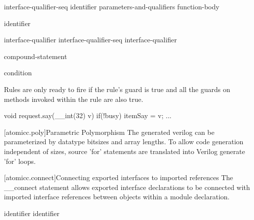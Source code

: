 \begin{bnf}
\br
     interface-qualifier-seq identifier parameters-and-qualifiers function-body
\end{bnf}

\begin{bnf}
\br
    identifier 

 \br
    interface-qualifier \br
    interface-qualifier-seq interface-qualifier
\end{bnf}

\begin{bnf}
\br
     compound-statement

\br
     condition \terminal{)}

\end{bnf}


Rules are only ready to fire if the rule's guard is true and all the
guards on methods invoked within the rule are also true.

\begin{codeblock}
         void request.say(__int(32) v) if(!busy) {
             itemSay = v;
             ...
         }
\end{codeblock}

[atomicc.poly]{Parametric Polymorphism}
The generated verilog can be parameterized by datatype bitsizes and array lengths.
To allow code generation independent of sizes,
source 'for' statements are translated into
Verilog generate 'for' loops.

[atomicc.connect]{Connecting exported interfaces to imported references}
The __connect statement allows exported interface declarations to be connected
with imported interface references between objects within a module declaration.

\begin{bnf}
\br
     identifier \terminal{=} identifier \terminal{;}
\end{bnf}

